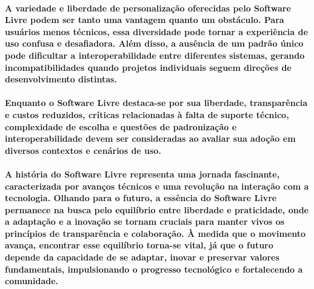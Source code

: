 \documentclass[a4paper, 12pt]{article}
\begin{document}
\paragraph{A variedade e liberdade de personalização oferecidas pelo Software Livre podem ser tanto uma vantagem quanto um obstáculo. Para usuários menos técnicos, essa diversidade pode tornar a experiência de uso confusa e desafiadora. Além disso, a ausência de um padrão único pode dificultar a interoperabilidade entre diferentes sistemas, gerando incompatibilidades quando projetos individuais seguem direções de desenvolvimento distintas.}
\paragraph{Enquanto o Software Livre destaca-se por sua liberdade, transparência e custos reduzidos, críticas relacionadas à falta de suporte técnico, complexidade de escolha e questões de padronização e interoperabilidade devem ser consideradas ao avaliar sua adoção em diversos contextos e cenários de uso.}

\paragraph{A história do Software Livre representa uma jornada fascinante, caracterizada por avanços técnicos e uma revolução na interação com a tecnologia. Olhando para o futuro, a essência do Software Livre permanece na busca pelo equilíbrio entre liberdade e praticidade, onde a adaptação e a inovação se tornam cruciais para manter vivos os princípios de transparência e colaboração. À medida que o movimento avança, encontrar esse equilíbrio torna-se vital, já que o futuro depende da capacidade de se adaptar, inovar e preservar valores fundamentais, impulsionando o progresso tecnológico e fortalecendo a comunidade.}
\end{document}
